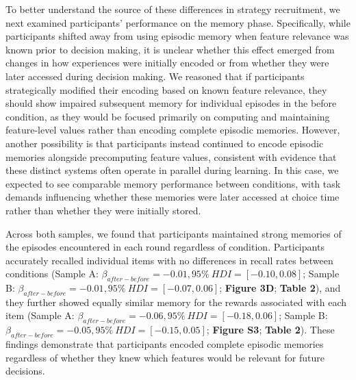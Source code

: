 \documentclass[10pt,letterpaper]{article}
\begin{document}
To better understand the source of these differences in strategy recruitment, we next examined participants' performance on the memory phase. Specifically, while participants shifted away from using episodic memory when feature relevance was known prior to decision making, it is unclear whether this effect emerged from changes in how experiences were initially encoded or from whether they were later accessed during decision making. We reasoned that if participants strategically modified their encoding based on known feature relevance, they should show impaired subsequent memory for individual episodes in the before condition, as they would be focused primarily on computing and maintaining feature-level values rather than encoding complete episodic memories. However, another possibility is that participants instead continued to encode episodic memories alongside precomputing feature values, consistent with evidence that these distinct systems often operate in parallel during learning\cite{nicholasUncertaintyAltersBalance2022a, bornsteinRemindersChoicesBias2017a, leeNeuralComputationsMediating2015, packardInactivationHippocampusCaudate1996, poldrackCompetitionMultipleMemory2003}. In this case, we expected to see comparable memory performance between conditions, with task demands influencing whether these memories were later accessed at choice time rather than whether they were initially stored.

Across both samples, we found that participants maintained strong memories of the episodes encountered in each round regardless of condition. Participants accurately recalled individual items with no differences in recall rates between conditions (Sample A: $\beta_{after-before} = -0.01, 95\% \ HDI = [-0.10, 0.08]$; Sample B: $\beta_{after-before} = -0.01, 95\% \ HDI = [-0.07, 0.06]$; \textbf{Figure 3D}; \textbf{Table 2}), and they further showed equally similar memory for the rewards associated with each item (Sample A: $\beta_{after-before} = -0.06, 95\% \ HDI = [-0.18, 0.06]$; Sample B: $\beta_{after-before} = -0.05, 95\% \ HDI = [-0.15, 0.05]$; \textbf{Figure S3}; \textbf{Table 2}). These findings demonstrate that participants encoded complete episodic memories regardless of whether they knew which features would be relevant for future decisions.
\end{document}
